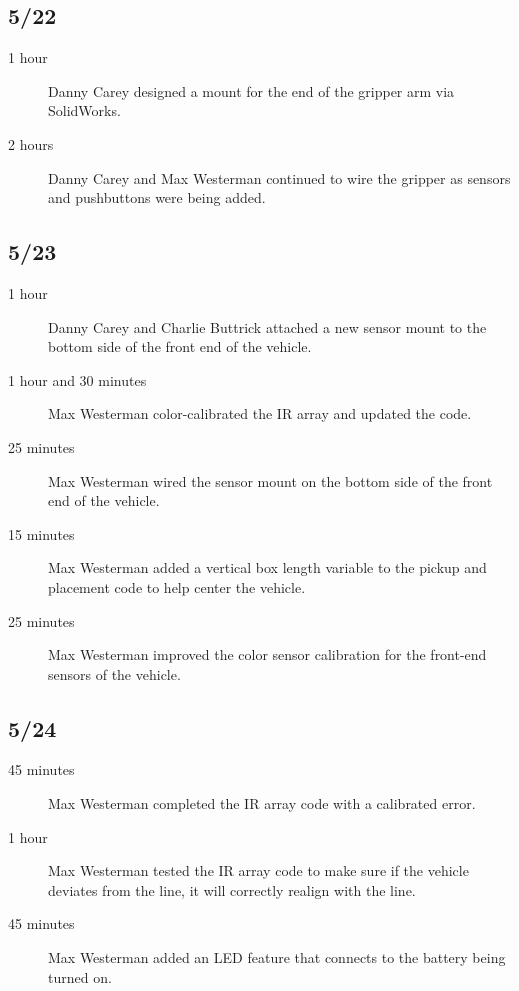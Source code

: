 \documentclass[11pt]{report}
\begin{document}
\begin{adjustwidth}{0.5cm}{0cm}
\vspace{-2.1em}\subsection*{5/22}
\begin{greylineformat}
\begin{description}
    \item [1 hour] Danny Carey designed a mount for the end of the gripper arm via SolidWorks. 
    \item [2 hours] Danny Carey and Max Westerman continued to wire the gripper as sensors and pushbuttons were being added. 
\end{description}\end{greylineformat}

\vspace{-2.1em}\subsection*{5/23}
\begin{greylineformat}
\begin{description}
    \item [1 hour] Danny Carey and Charlie Buttrick attached a new sensor mount to the bottom side of the front end of the vehicle. 
    \item [1 hour and 30 minutes] Max Westerman color-calibrated the \gls{IR} array and updated the code. 
    \item [25 minutes] Max Westerman wired the sensor mount on the bottom side of the front end of the vehicle. 
    \item [15 minutes] Max Westerman added a vertical box length variable to the pickup and placement code to help center the vehicle. 
    \item [25 minutes] Max Westerman improved the color sensor calibration for the front-end sensors of the vehicle. 
\end{description}\end{greylineformat}

\vspace{-2.1em}\subsection*{5/24}
\begin{greylineformat}
\begin{description}
    \item [45 minutes] Max Westerman completed the \gls{IR} array code with a calibrated error. 
    \item [1 hour] Max Westerman tested the \gls{IR} array code to make sure if the vehicle deviates from the line, it will correctly realign with the line. 
    \item [45 minutes] Max Westerman added an \gls{LED} feature that connects to the battery being turned on. 
\end{description}\end{greylineformat}


\end{adjustwidth}
\end{document}
